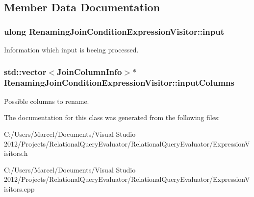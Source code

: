\subsection{Member Data Documentation}
\hypertarget{class_renaming_join_condition_expression_visitor_a8ce65701767eb8d0e6e96eeee49276ea}{
\subsubsection[{input}]{\setlength{\rightskip}{0pt plus 5cm}ulong Renaming\+Join\+Condition\+Expression\+Visitor\+::input}}\label{class_renaming_join_condition_expression_visitor_a8ce65701767eb8d0e6e96eeee49276ea}
Information which input is beeing processed. \hypertarget{class_renaming_join_condition_expression_visitor_a8b8dceeedbf7c4d3aac3761ce3a4c302}{
\subsubsection[{input\+Columns}]{\setlength{\rightskip}{0pt plus 5cm}std\+::vector$<${\bf Join\+Column\+Info}$>$$\ast$ Renaming\+Join\+Condition\+Expression\+Visitor\+::input\+Columns}}\label{class_renaming_join_condition_expression_visitor_a8b8dceeedbf7c4d3aac3761ce3a4c302}
Possible columns to rename. 

The documentation for this class was generated from the following files\+:\begin{DoxyCompactItemize}
\item 
C\+:/\+Users/\+Marcel/\+Documents/\+Visual Studio 2012/\+Projects/\+Relational\+Query\+Evaluator/\+Relational\+Query\+Evaluator/Expression\+Visitors.\+h\item 
C\+:/\+Users/\+Marcel/\+Documents/\+Visual Studio 2012/\+Projects/\+Relational\+Query\+Evaluator/\+Relational\+Query\+Evaluator/Expression\+Visitors.\+cpp\end{DoxyCompactItemize}
